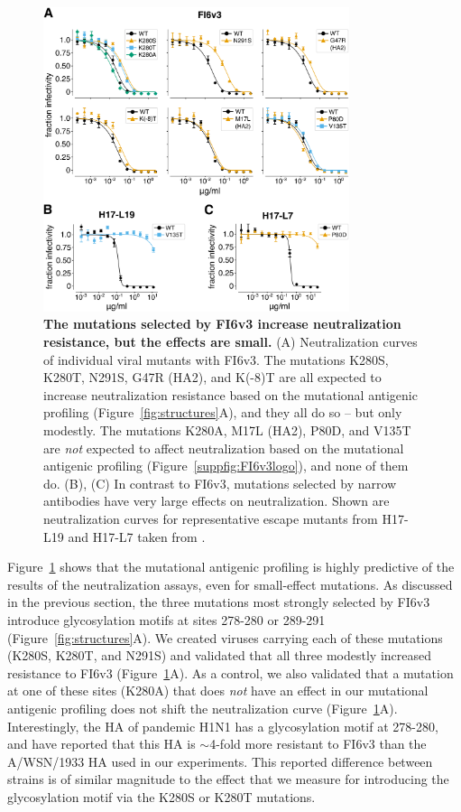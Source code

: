 \documentclass[11pt]{article}
\begin{document}
\begin{figure}
\centerline{\includegraphics[width=0.8\textwidth]{figs/FI6v3mutant_neutcurves/FI6v3_mutant_neutcurves.pdf}}
\caption{
\label{fig:FI6v3neutcurves}
{\bf The mutations selected by FI6v3 increase neutralization resistance, but the effects are small.}
(A) Neutralization curves of individual viral mutants with FI6v3.
The mutations K280S, K280T, N291S, G47R (HA2), and K(-8)T are all expected to increase neutralization resistance based on the mutational antigenic profiling (Figure~\ref{fig:structures}A), and they all do so -- but only modestly. 
The mutations K280A, M17L (HA2), P80D, and V135T are \emph{not} expected to affect neutralization based on the mutational antigenic profiling (Figure~\ref{suppfig:FI6v3logo}), and none of them do.
(B), (C) In contrast to FI6v3, mutations selected by narrow antibodies have very large effects on neutralization.
Shown are neutralization curves for representative escape mutants from H17-L19 and H17-L7 taken from \citet{doud2017complete}.
}
\end{figure}

Figure~\ref{fig:FI6v3neutcurves} shows that the mutational antigenic profiling is highly predictive of the results of the neutralization assays, even for small-effect mutations.
As discussed in the previous section, the three mutations most strongly selected by FI6v3 introduce glycosylation motifs at sites 278-280 or 289-291 (Figure~\ref{fig:structures}A).
We created viruses carrying each of these mutations (K280S, K280T, and N291S) and validated that all three modestly increased resistance to FI6v3 (Figure~\ref{fig:FI6v3neutcurves}A).
As a control, we also validated that a mutation at one of these sites (K280A) that does \emph{not} have an effect in our mutational antigenic profiling does not shift the neutralization curve (Figure~\ref{fig:FI6v3neutcurves}A).
Interestingly, the HA of pandemic H1N1 has a glycosylation motif at 278-280, and \citet{corti2011neutralizing} have reported that this HA is $\sim$4-fold more resistant to FI6v3 than the A/WSN/1933 HA used in our experiments.
This reported difference between strains is of similar magnitude to the effect that we measure for introducing the glycosylation motif via the K280S or K280T mutations.
\end{document}
